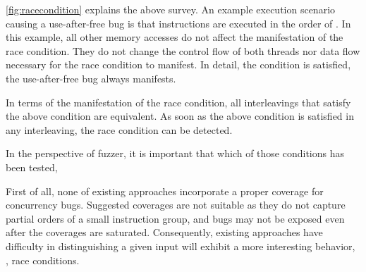 \autoref{fig:racecondition} explains the above survey. An example
execution scenario causing a use-after-free bug is that instructions
are executed in the order of .
%
In this example, all other memory accesses do not affect the
manifestation of the race condition. They do not change the control
flow of both threads nor data flow necessary for the race condition to
manifest.
%
In detail, the condition  is satisfied, the use-after-free bug always manifests.

In terms of the manifestation of the race condition, all interleavings
that satisfy the above condition are equivalent. As soon as the above
condition is satisfied in any interleaving, the race condition can be
detected.


In the perspective of fuzzer, it is important that which of those
conditions has been tested,







%
First of all, none of existing approaches incorporate a proper
coverage for concurrency bugs.
%
Suggested coverages are not suitable as
they do not capture partial orders of a small instruction group, and
bugs may not be exposed even after the coverages are saturated.
Consequently, existing approaches have difficulty in distinguishing a
given input will exhibit a more interesting behavior, \ie, race
conditions.


